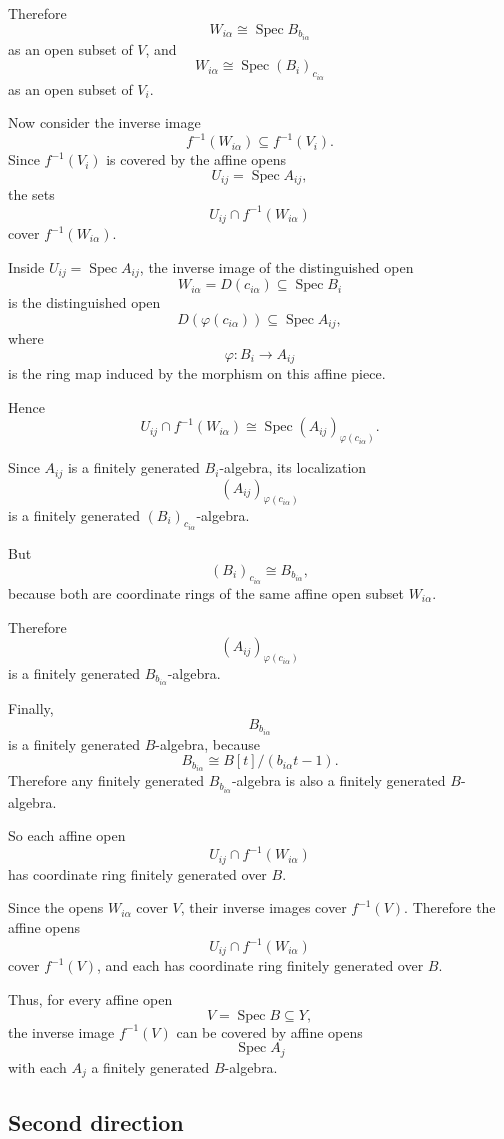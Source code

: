 Therefore
\[
W_{i\alpha}\cong \operatorname{Spec} B_{b_{i\alpha}}
\]
as an open subset of \(V\), and
\[
W_{i\alpha}\cong \operatorname{Spec} (B_i)_{c_{i\alpha}}
\]
as an open subset of \(V_i\).

Now consider the inverse image
\[
f^{-1}(W_{i\alpha})\subseteq f^{-1}(V_i).
\]
Since \(f^{-1}(V_i)\) is covered by the affine opens
\[
U_{ij}=\operatorname{Spec} A_{ij},
\]
the sets
\[
U_{ij}\cap f^{-1}(W_{i\alpha})
\]
cover \(f^{-1}(W_{i\alpha})\).

Inside \(U_{ij}=\operatorname{Spec} A_{ij}\), the inverse image of the distinguished open
\[
W_{i\alpha}=D(c_{i\alpha})\subseteq \operatorname{Spec} B_i
\]
is the distinguished open
\[
D(\varphi(c_{i\alpha}))\subseteq \operatorname{Spec} A_{ij},
\]
where
\[
\varphi:B_i\to A_{ij}
\]
is the ring map induced by the morphism on this affine piece.

Hence
\[
U_{ij}\cap f^{-1}(W_{i\alpha})
\cong
\operatorname{Spec} (A_{ij})_{\varphi(c_{i\alpha})}.
\]

Since \(A_{ij}\) is a finitely generated \(B_i\)-algebra, its localization
\[
(A_{ij})_{\varphi(c_{i\alpha})}
\]
is a finitely generated \((B_i)_{c_{i\alpha}}\)-algebra.

But
\[
(B_i)_{c_{i\alpha}}\cong B_{b_{i\alpha}},
\]
because both are coordinate rings of the same affine open subset \(W_{i\alpha}\).

Therefore
\[
(A_{ij})_{\varphi(c_{i\alpha})}
\]
is a finitely generated \(B_{b_{i\alpha}}\)-algebra.

Finally,
\[
B_{b_{i\alpha}}
\]
is a finitely generated \(B\)-algebra, because
\[
B_{b_{i\alpha}}\cong B[t]/(b_{i\alpha}t-1).
\]
Therefore any finitely generated \(B_{b_{i\alpha}}\)-algebra is also a finitely generated \(B\)-algebra.

So each affine open
\[
U_{ij}\cap f^{-1}(W_{i\alpha})
\]
has coordinate ring finitely generated over \(B\).

Since the opens \(W_{i\alpha}\) cover \(V\), their inverse images cover \(f^{-1}(V)\). Therefore the affine opens
\[
U_{ij}\cap f^{-1}(W_{i\alpha})
\]
cover \(f^{-1}(V)\), and each has coordinate ring finitely generated over \(B\).

Thus, for every affine open
\[
V=\operatorname{Spec} B\subseteq Y,
\]
the inverse image \(f^{-1}(V)\) can be covered by affine opens
\[
\operatorname{Spec} A_j
\]
with each \(A_j\) a finitely generated \(B\)-algebra.

\subsection*{Second direction}

